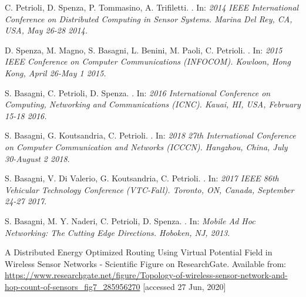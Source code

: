 \documentclass[binding=0.6cm,TFA]{sapthesis}
\begin{document}
\begin{thebibliography}{9}

    C. Petrioli, D. Spenza, P. Tommasino, A. Trifiletti.
    .
    In: \textit{2014 IEEE International Conference on Distributed Computing in Sensor Systems. Marina Del Rey, CA, USA, May 26-28 2014.}

    D. Spenza, M. Magno, S. Basagni, L. Benini, M. Paoli, C. Petrioli.
    .
    In: \textit{2015 IEEE Conference on Computer Communications (INFOCOM). Kowloon, Hong Kong, April 26-May 1 2015.}

    S. Basagni, C. Petrioli, D. Spenza.
    .
    In: \textit{2016 International Conference on Computing, Networking and Communications (ICNC). Kauai, HI, USA, February 15-18 2016.}

    S. Basagni, G. Koutsandria, C. Petrioli.
    .
    In: \textit{2018 27th International Conference on Computer Communication and Networks (ICCCN). Hangzhou, China, July 30-August 2 2018}.

    S. Basagni, V. Di Valerio, G. Koutsandria, C. Petrioli.
    .
    In: \textit{2017 IEEE 86th Vehicular Technology Conference (VTC-Fall). Toronto, ON, Canada, September 24-27 2017}.

    S. Basagni, M. Y. Naderi, C. Petrioli, D. Spenza.
    .
    In: \textit{Mobile Ad Hoc Networking: The Cutting Edge Directions. Hoboken, NJ, 2013}.

    \newpage        %

    A Distributed Energy Optimized Routing Using Virtual Potential Field in Wireless Sensor Networks - Scientific Figure on ResearchGate.
    Available from: \url{https://www.researchgate.net/figure/Topology-of-wireless-sensor-network-and-hop-count-of-sensors_fig7_285956270} [accessed 27 Jun, 2020]


\end{thebibliography}
\end{document}
